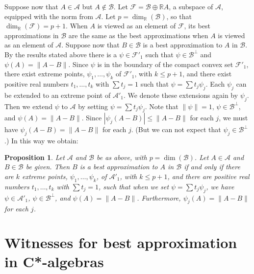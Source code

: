\documentclass[12pt]{amsart}
\newcommand{\<}{\langle}
\renewcommand{\>}{\rangle}
\newcommand{\cA}{{\mathcal A}}
\newcommand{\cB}{{\mathcal B}}
\newcommand{\cF}{{\mathcal F}}
\newcommand{\cAo}{{\mathcal A}'_1}
\newcommand{\cFo}{{\mathcal F}'_1}
\newcommand{\bR}{{\mathbb R}}
\newtheorem{proposition}[theorem]{Proposition}
\theoremstyle{definition}   %
\begin{document}
Suppose now that $A \in \cA$ but $A \notin \cB$. Let $\cF = \cB \oplus \bR A$,
a subspace of $\cA$, equipped with the norm from $\cA$. Let 
$p = \dim_\bR(\cB)$, so that $\dim_\bR(\cF) = p+1$. When $A$ is viewed as
an element of $\cF$, its best approximations in $\cB$ are the same as
the best approximations when $A$ is viewed as an element of $\cA$.
Suppose now that $B\in \cB$ is a best approximation to $A$
in $\cB$. By the results stated above there is a $\psi \in \cFo$ such that
$\psi \in \cB^\perp$ and $\psi(A) = \|A-B\|$. Since $\psi$ is in the boundary
of the compact convex set $\cFo$, there exist extreme points,
$\psi_1, \dots, \psi_k$ of $\cFo$, with $k \leq p+1$, and there exist
positive real numbers $t_1, \dots, t_k$ with $\sum t_j = 1$
such that $\psi = \sum t_j\psi_j$. Each $\psi_j$ can be extended to
an extreme point of $\cAo$. We denote these extensions again by
$\psi_j$. Then we extend $\psi$ to $\cA$ by setting 
$\psi = \sum t_j\psi_j$. Note that $\|\psi\| = 1$, $\psi \in \cB^\perp$,
and $\psi(A) = \|A-B\|$. Since $|\psi_j(A-B)| \leq \|A-B\|$ for each $j$,
we must have $\psi_j(A-B) =  \|A-B\|$ for each $j$. (But we can not
expect that $\psi_j \in \cB^\perp$.) In this way we obtain:

\begin{proposition}
\label{prop-ext}
Let $\cA$ and $\cB$ be as above, with $p = \dim(\cB)$. Let $A \in \cA$
and $B \in \cB$ be given. Then $B$ is a best approximation to $A$ in
$\cB$ if and only if there are $k$ extreme points, 
$\psi_1, \dots, \psi_k$, of $\cAo$, with $k \leq p+1$, and there are
positive real numbers $t_1, \dots, t_k$ with $\sum t_j = 1$,
such that when we set $\psi = \sum t_j\psi_j$, we have $\psi \in \cAo$,
$\psi \in \cB^\perp$, and $\psi(A) = \|A-B\|$. Furthermore, 
$\psi_j(A) = \|A-B\|$ for each $j$. 
\end{proposition}


\section{Witnesses for best approximation in C*-algebras}
\label{wit-alg}
\end{document}
